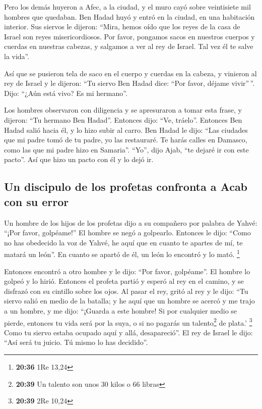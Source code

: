 \begin{paracol}{2}
 Pero los demás huyeron a Afec, a la ciudad, y el muro
cayó sobre veintisiete mil hombres que quedaban. Ben Hadad huyó y entró
en la ciudad, en una habitación interior.  Sus siervos le
dijeron: ``Mira, hemos oído que los reyes de la casa de Israel son reyes
misericordiosos. Por favor, pongamos sacos en nuestros cuerpos y cuerdas
en nuestras cabezas, y salgamos a ver al rey de Israel. Tal vez él te
salve la vida''.

 Así que se pusieron tela de saco en el cuerpo y cuerdas
en la cabeza, y vinieron al rey de Israel y le dijeron: ``Tu siervo Ben
Hadad dice: ``Por favor, déjame vivir''\,''. Dijo: ``¿Aún está vivo? Es
mi hermano''.

 Los hombres observaron con diligencia y se apresuraron a
tomar esta frase, y dijeron: ``Tu hermano Ben Hadad''. Entonces dijo:
``Ve, tráelo''. Entonces Ben Hadad salió hacia él, y lo hizo subir al
carro.  Ben Hadad le dijo: ``Las ciudades que mi padre
tomó de tu padre, yo las restauraré. Te harás calles en Damasco, como
las que mi padre hizo en Samaria''. ``Yo'', dijo Ajab, ``te dejaré ir
con este pacto''. Así que hizo un pacto con él y lo dejó ir.

\hypertarget{un-discipulo-de-los-profetas-confronta-a-acab-con-su-error}{%
\subsection{Un discipulo de los profetas confronta a Acab con su
error}\label{un-discipulo-de-los-profetas-confronta-a-acab-con-su-error}}

 Un hombre de los hijos de los profetas dijo a su
compañero por palabra de Yahvé: ``¡Por favor, golpéame!'' El hombre se
negó a golpearlo.  Entonces le dijo: ``Como no has
obedecido la voz de Yahvé, he aquí que en cuanto te apartes de mí, te
matará un león''. En cuanto se apartó de él, un león lo encontró y lo
mató. \footnote{\textbf{20:36} 1Re 13,24}

 Entonces encontró a otro hombre y le dijo: ``Por favor,
golpéame''. El hombre lo golpeó y lo hirió.  Entonces el
profeta partió y esperó al rey en el camino, y se disfrazó con su
cintillo sobre los ojos.  Al pasar el rey, gritó al rey y
le dijo: ``Tu siervo salió en medio de la batalla; y he aquí que un
hombre se acercó y me trajo a un hombre, y me dijo: ``¡Guarda a este
hombre! Si por cualquier medio se pierde, entonces tu vida será por la
suya, o si no pagarás un talento\footnote{\textbf{20:39} Un talento son
  unos 30 kilos o 66 libras} de plata.' \footnote{\textbf{20:39} 2Re
  10,24}  Como tu siervo estaba ocupado aquí y allá,
desapareció''. El rey de Israel le dijo: ``Así será tu juicio. Tú mismo
lo has decidido''.


\end{paracol}
